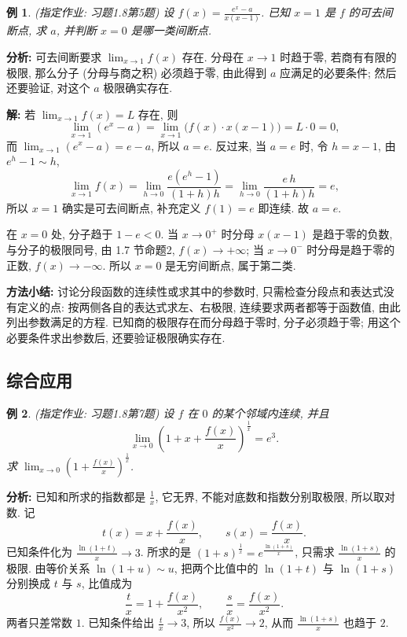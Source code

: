\documentclass[UTF8,openany]{ctexbook}
\theoremstyle{chinesetextbook}
\newtheorem{example}{例}[section]
\newenvironment{cnsolution}{\par\indent\textbf{解:} \ignorespaces}{\par}
\begin{document}
\begin{example}
\textnormal{(指定作业: 习题1.8第5题)} 设 $\displaystyle f(x)=\frac{e^x-a}{x(x-1)}$. 已知 $x=1$ 是 $f$ 的可去间断点, 求 $a$, 并判断 $x=0$ 是哪一类间断点.
\end{example}
\par\indent\textbf{分析:} 可去间断要求 $\displaystyle\lim_{x\to1}f(x)$ 存在. 分母在 $x\to1$ 时趋于零, 若商有有限的极限, 那么分子 (分母与商之积) 必须趋于零, 由此得到 $a$ 应满足的必要条件; 然后还要验证, 对这个 $a$ 极限确实存在.
\begin{cnsolution}
若 $\displaystyle\lim_{x\to1}f(x)=L$ 存在, 则
\[
\lim_{x\to1}(e^x-a)=\lim_{x\to1}\bigl(f(x)\cdot x(x-1)\bigr)=L\cdot0=0,
\]
而 $\displaystyle\lim_{x\to1}(e^x-a)=e-a$, 所以 $a=e$. 反过来, 当 $a=e$ 时, 令 $h=x-1$, 由 $e^h-1\sim h$,
\[
\lim_{x\to1}f(x)=\lim_{h\to0}\frac{e(e^h-1)}{(1+h)h}=\lim_{h\to0}\frac{e\,h}{(1+h)h}=e,
\]
所以 $x=1$ 确实是可去间断点, 补充定义 $f(1)=e$ 即连续. 故 $a=e$.

在 $x=0$ 处, 分子趋于 $1-e<0$. 当 $x\to0^+$ 时分母 $x(x-1)$ 是趋于零的负数, 与分子的极限同号, 由 1.7 节命题2, $f(x)\to+\infty$; 当 $x\to0^-$ 时分母是趋于零的正数, $f(x)\to-\infty$. 所以 $x=0$ 是无穷间断点, 属于第二类.
\end{cnsolution}
\par\indent\textbf{方法小结:} 讨论分段函数的连续性或求其中的参数时, 只需检查分段点和表达式没有定义的点: 按两侧各自的表达式求左、右极限, 连续要求两者都等于函数值, 由此列出参数满足的方程. 已知商的极限存在而分母趋于零时, 分子必须趋于零; 用这个必要条件求出参数后, 还要验证极限确实存在.
\subsection{综合应用}
\begin{example}
\textnormal{(指定作业: 习题1.8第7题)} 设 $f$ 在 $0$ 的某个邻域内连续, 并且
\[
\lim_{x\to0}\left(1+x+\frac{f(x)}x\right)^{\frac1x}=e^3.
\]
求 $\displaystyle\lim_{x\to0}\left(1+\frac{f(x)}x\right)^{\frac1x}$.
\end{example}
\par\indent\textbf{分析:} 已知和所求的指数都是 $\displaystyle\frac1x$, 它无界, 不能对底数和指数分别取极限, 所以取对数. 记
\[
t(x)=x+\frac{f(x)}x,\qquad s(x)=\frac{f(x)}x.
\]
已知条件化为 $\displaystyle\frac{\ln(1+t)}x\to3$. 所求的是 $\displaystyle(1+s)^{\frac1x}=e^{\frac{\ln(1+s)}x}$, 只需求 $\displaystyle\frac{\ln(1+s)}x$ 的极限. 由等价关系 $\ln(1+u)\sim u$, 把两个比值中的 $\ln(1+t)$ 与 $\ln(1+s)$ 分别换成 $t$ 与 $s$, 比值成为
\[
\frac tx=1+\frac{f(x)}{x^2},\qquad\frac sx=\frac{f(x)}{x^2}.
\]
两者只差常数 $1$. 已知条件给出 $\displaystyle\frac tx\to3$, 所以 $\displaystyle\frac{f(x)}{x^2}\to2$, 从而 $\displaystyle\frac{\ln(1+s)}x$ 也趋于 $2$.
\end{document}
